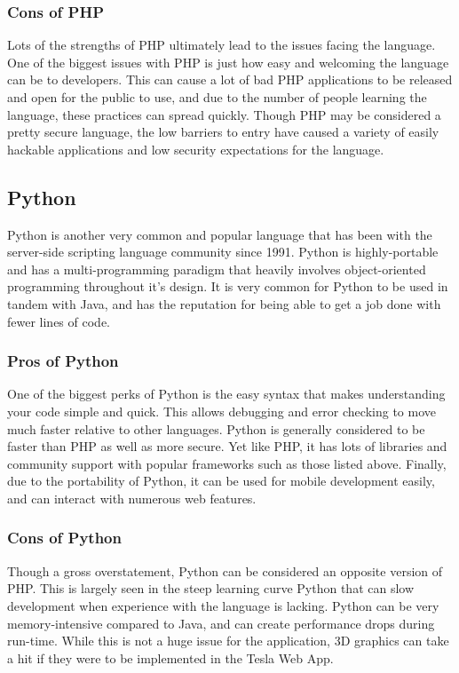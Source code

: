 \documentclass[onecolumn, draftclsnofoot,10pt, compsoc]{IEEEtran}
\begin{document}
\subsubsection{Cons of PHP}
Lots of the strengths of PHP ultimately lead to the issues facing the language. One of the biggest issues with PHP is just how easy and welcoming the language can be to developers. This can cause a lot of bad PHP applications to be released and open for the public to use, and due to the number of people learning the language, these practices can spread quickly. Though PHP may be considered a pretty secure language, the low barriers to entry have caused a variety of easily hackable applications and low security expectations for the language. \cite{o'dell_2010}

\subsection{Python}
Python is another very common and popular language that has been with the server-side scripting language community since 1991. Python is highly-portable and has a multi-programming paradigm that heavily involves object-oriented programming throughout it’s design. It is very common for Python to be used in tandem with Java, and has the reputation for being able to get a job done with fewer lines of code.

\subsubsection{Pros of Python}
One of the biggest perks of Python is the easy syntax that makes understanding your code simple and quick. This allows debugging and error checking to move much faster relative to other languages. Python is generally considered to be faster than PHP as well as more secure. Yet like PHP, it has lots of libraries and community support with popular frameworks such as those listed above. Finally, due to the portability of Python, it can be used for mobile development easily, and can interact with numerous web features. 

\subsubsection{Cons of Python}
Though a gross overstatement, Python can be considered an opposite version of PHP. This is largely seen in the steep learning curve Python that can slow development when experience with the language is lacking. Python can be very memory-intensive compared to Java, and can create performance drops during run-time. While this is not a huge issue for the application, 3D graphics can take a hit if they were to be implemented in the Tesla Web App. \cite{intersog_2017}
\end{document}

